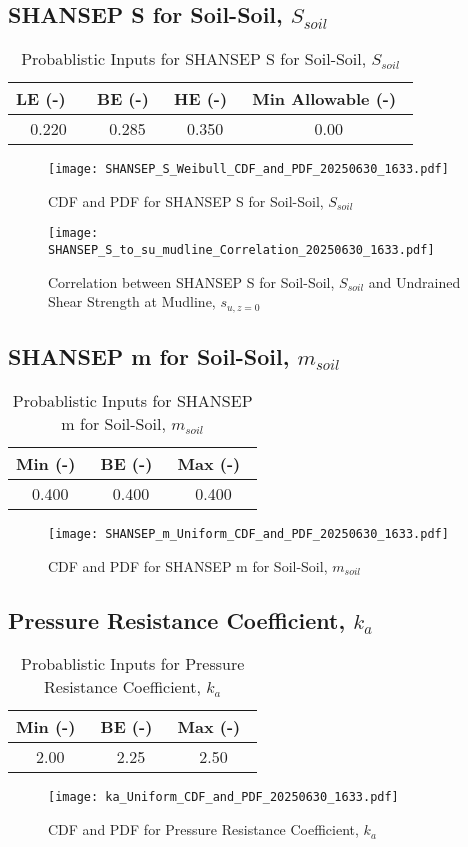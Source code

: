 \documentclass{article}
\begin{document}
\subsection*{SHANSEP S for Soil-Soil, $S_{soil}$}
\begin{table}[h!]
\centering
\caption{Probablistic Inputs for SHANSEP S for Soil-Soil, $S_{soil}$}
\begin{tabular}{|c|c|c|c|}
\hline
LE (-) \ & BE (-)\ & HE (-)\ & Min Allowable (-)\ \\
\hline
0.220 & 0.285 & 0.350 & 0.00 \\
\hline
\end{tabular}
\end{table}
\begin{figure}[h!]
\centering
\texttt{[image: SHANSEP\_S\_Weibull\_CDF\_and\_PDF\_20250630\_1633.pdf]}
\caption{CDF and PDF for SHANSEP S for Soil-Soil, $S_{soil}$}
\end{figure}
\begin{figure}[h!]
\centering
\texttt{[image: SHANSEP\_S\_to\_su\_mudline\_Correlation\_20250630\_1633.pdf]}
\caption{Correlation between SHANSEP S for Soil-Soil, $S_{soil}$ and Undrained Shear Strength at Mudline, $s_{{u,z=0}}$}
\end{figure}
\clearpage
\subsection*{SHANSEP m for Soil-Soil, $m_{soil}$}
\begin{table}[h!]
\centering
\caption{Probablistic Inputs for SHANSEP m for Soil-Soil, $m_{soil}$}
\begin{tabular}{|c|c|c|}
\hline
Min (-)\ & BE (-)\ & Max (-)\ \\
\hline
0.400 & 0.400 & 0.400 \\
\hline
\end{tabular}
\end{table}
\begin{figure}[h!]
\centering
\texttt{[image: SHANSEP\_m\_Uniform\_CDF\_and\_PDF\_20250630\_1633.pdf]}
\caption{CDF and PDF for SHANSEP m for Soil-Soil, $m_{soil}$}
\end{figure}
\clearpage
\subsection*{Pressure Resistance Coefficient, $k_a$}
\begin{table}[h!]
\centering
\caption{Probablistic Inputs for Pressure Resistance Coefficient, $k_a$}
\begin{tabular}{|c|c|c|}
\hline
Min (-)\ & BE (-)\ & Max (-)\ \\
\hline
2.00 & 2.25 & 2.50 \\
\hline
\end{tabular}
\end{table}
\begin{figure}[h!]
\centering
\texttt{[image: ka\_Uniform\_CDF\_and\_PDF\_20250630\_1633.pdf]}
\caption{CDF and PDF for Pressure Resistance Coefficient, $k_a$}
\end{figure}
\clearpage
\end{document}
